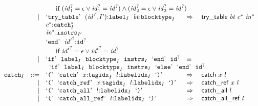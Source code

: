 $$\begin{array}[t]{@{}lrrl@{}l@{}l@{}l@{}}
&&& \multicolumn{4}{@{}l@{}}{\quad
\quad \mbox{if}~ ({{\mathit{id}}_1^?} = \epsilon \lor {{\mathit{id}}_1^?} = {{\mathit{id}}^?}) \land ({{\mathit{id}}_2^?} = \epsilon \lor {{\mathit{id}}_2^?} = {{\mathit{id}}^?})
} \\
& & | & \begin{array}[t]{@{}l@{}} \mbox{‘\texttt{try\_table}’}~~({{\mathit{id}}^?}, {I'}){:}{{\mathtt{label}}}_{I}~~{\mathit{bt}}{:}{{\mathtt{blocktype}}}_{I} \\
  {c^\ast}{:}{{{\mathtt{catch}}}_{I}^\ast} \\
  {{\mathit{in}}^\ast}{:}{{\mathtt{instrs}}}_{{I'}} \\
  \mbox{‘\texttt{end}’}~~{{\mathit{id}'}^?}{:}{{\mathtt{id}}^?} \end{array} & \quad\Rightarrow\quad{} & \mathsf{try\_table}~{\mathit{bt}}~{c^\ast}~{{\mathit{in}}^\ast} &  \\
&&& \multicolumn{4}{@{}l@{}}{\quad
\quad \mbox{if}~ {{\mathit{id}'}^?} = \epsilon \lor {{\mathit{id}'}^?} = {{\mathit{id}}^?}
} \\
& & | & \mbox{‘\texttt{if}’}~~{{\mathtt{label}}}_{I}~~{{\mathtt{blocktype}}}_{I}~~{{\mathtt{instrs}}}_{I}~~\mbox{‘\texttt{end}’}~~{{\mathtt{id}}^?} & \quad\equiv\quad{} & & \\
&&& \multicolumn{4}{@{}l@{}}{\quad
\begin{array}[t]{@{}l@{}}
\mbox{‘\texttt{if}’}~~{{\mathtt{label}}}_{I}~~{{\mathtt{blocktype}}}_{I}~~{{\mathtt{instrs}}}_{I}~~\mbox{‘\texttt{else}’}~~\mbox{‘\texttt{end}’}~~{{\mathtt{id}}^?} \\
\end{array}
} \\
& {{\mathtt{catch}}}_{I} & ::= & \mbox{‘\texttt{{(}}’}~~\mbox{‘\texttt{catch}’}~~x{:}{{\mathtt{tagidx}}}_{I}~~l{:}{{\mathtt{labelidx}}}_{I}~~\mbox{‘\texttt{{)}}’} & \quad\Rightarrow\quad{} & \mathsf{catch}~x~l \\
& & | & \mbox{‘\texttt{{(}}’}~~\mbox{‘\texttt{catch\_ref}’}~~x{:}{{\mathtt{tagidx}}}_{I}~~l{:}{{\mathtt{labelidx}}}_{I}~~\mbox{‘\texttt{{)}}’} & \quad\Rightarrow\quad{} & \mathsf{catch\_ref}~x~l \\
& & | & \mbox{‘\texttt{{(}}’}~~\mbox{‘\texttt{catch\_all}’}~~l{:}{{\mathtt{labelidx}}}_{I}~~\mbox{‘\texttt{{)}}’} & \quad\Rightarrow\quad{} & \mathsf{catch\_all}~l \\
& & | & \mbox{‘\texttt{{(}}’}~~\mbox{‘\texttt{catch\_all\_ref}’}~~l{:}{{\mathtt{labelidx}}}_{I}~~\mbox{‘\texttt{{)}}’} & \quad\Rightarrow\quad{} & \mathsf{catch\_all\_ref}~l \\
\end{array}
$$

